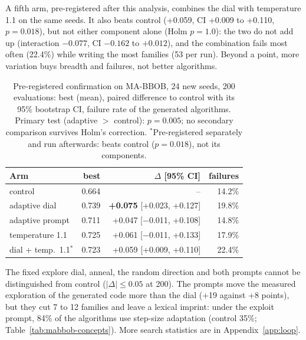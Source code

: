 A fifth arm, pre-registered after this analysis, combines the dial with
temperature 1.1 on the same seeds. It also beats control (+0.059, CI
+0.009 to +0.110, $p=0.018$), but not either component alone (Holm
$p=1.0$): the two do not add up (interaction $-0.077$, CI $-0.162$ to
$+0.012$), and the combination fails most often (22.4\%) while
writing the most families (53 per run). Beyond a point, more variation
buys breadth and failures, not better algorithms.

\begin{table}[t]
  \caption{Pre-registered confirmation on MA-BBOB, 24 new seeds, 200
    evaluations: best \aocc (mean), paired difference to control with its
    95\% bootstrap CI, failure rate of the generated algorithms. Primary
    test (adaptive $>$ control): $p=0.005$; no secondary comparison
    survives Holm's correction. $^\ast$Pre-registered separately and
    run afterwards: beats control ($p=0.018$), not its components.}
  \label{tab:confirm}
  \small
  \setlength{\tabcolsep}{4pt}
  \begin{tabular}{lrrr}
    \toprule
    Arm & best & $\Delta$ [95\% CI] & failures\\
    \midrule
    control & 0.664 & -- & 14.2\%\\
    adaptive dial & 0.739 & \textbf{+0.075} [+0.023, +0.127] & 19.8\%\\
    adaptive prompt & 0.711 & +0.047 [$-$0.011, +0.108] & 14.8\%\\
    temperature 1.1 & 0.725 & +0.061 [$-$0.011, +0.133] & 17.9\%\\
    dial + temp.\ 1.1$^\ast$ & 0.723 & +0.059 [+0.009, +0.110] & 22.4\%\\
    \bottomrule
  \end{tabular}
\end{table}

The fixed explore dial, anneal, the random direction and both prompts
cannot be distinguished from control ($|\Delta|\le0.05$ at 200). The
prompts move the measured exploration of the generated code more than
the dial (+19 against +8 points), but they cut 7 to 12 families and
leave a lexical imprint: under the exploit prompt, 84\% of the
algorithms use step-size adaptation (control 35\%;
Table~\ref{tab:mabbob-concepts}). More search statistics are in
Appendix~\ref{app:loop}.

